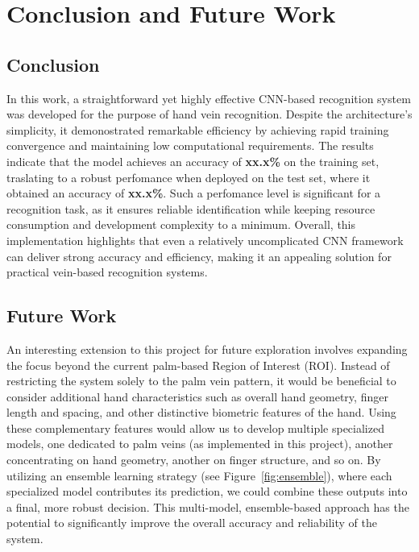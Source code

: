 \section{Conclusion and Future Work}
\subsection{Conclusion}

In this work, a straightforward yet highly effective CNN-based recognition system was developed for the purpose of hand vein recognition. Despite the architecture's simplicity, it demonostrated remarkable efficiency by achieving rapid training convergence and maintaining low computational requirements. The results indicate that the model achieves an accuracy of \textbf{xx.x\%} on the training set, traslating to a robust perfomance when deployed on the test set, where it obtained an accuracy of \textbf{xx.x\%}. Such a perfomance level is significant for a recognition task, as it ensures reliable identification while keeping resource consumption and development complexity to a minimum. Overall, this implementation highlights that even a relatively uncomplicated CNN framework can deliver strong accuracy and efficiency, making it an appealing solution for practical vein-based recognition systems.

\subsection{Future Work}

An interesting extension to this project for future exploration involves expanding the focus beyond the current palm-based Region of Interest (ROI). Instead of restricting the system solely to the palm vein pattern, it would be beneficial to consider additional hand characteristics such as overall hand geometry, finger length and spacing, and other distinctive biometric features of the hand. Using these complementary features would allow us to develop multiple specialized models, one dedicated to palm veins (as implemented in this project), another concentrating on hand geometry, another on finger structure, and so on. By utilizing an ensemble learning strategy (see Figure~\ref{fig:ensemble}), where each specialized model contributes its prediction, we could combine these outputs into a final, more robust decision. This multi-model, ensemble-based approach has the potential to significantly improve the overall accuracy and reliability of the system.

